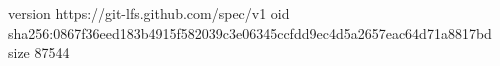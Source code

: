 version https://git-lfs.github.com/spec/v1
oid sha256:0867f36eed183b4915f582039c3e06345ccfdd9ec4d5a2657eac64d71a8817bd
size 87544
